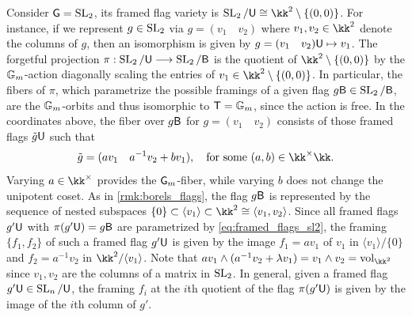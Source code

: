 \begin{example}\label{ex:framed_flags_SL2}
Consider $\mathsf{G}=\operatorname{SL}_2$, its framed flag variety is $\SL_2/\uni\cong\kk^2 \setminus \{(0,0)\}$. For instance, if we represent $g\in\operatorname{SL}_2$ via $g=(v_1\quad v_2)$ where $v_1,v_2\in\kk^2$ denote the columns of $g$, then an isomorphism is given by $g=(v_1\quad v_2)\mathsf{U}\mapsto v_1$. The forgetful projection $\pi:\operatorname{SL}_2/\mathsf{U}\longrightarrow\operatorname{SL}_2/\mathsf{B}$ is the quotient of $\kk^2 \setminus \{(0,0)\}$ by the $\mathbb{G}_m$-action diagonally scaling the entries of $v_1\in \kk^2 \setminus \{(0,0)\}$. In particular, the fibers of $\pi$, which parametrize the possible framings of a given flag $g\mathsf{B}\in\operatorname{SL}_2/\mathsf{B}$, are the $\mathbb{G}_m$-orbits and thus isomorphic to $\mathsf{T}=\mathbb{G}_m$, since the action is free. In the coordinates above, the fiber over $g\mathsf{B}$ for $g=(v_1\quad v_2)$ consists of those framed flags $\tilde{g}\mathsf{U}$ such that
\begin{equation}\label{eq:framed_flags_sl2}
\tilde{g}=(av_1\quad a^{-1}v_2+bv_1),\quad \mbox{for some }(a,b)\in\kk^\times\kk.
\end{equation}
Varying $a\in\kk^\times$ provides the $\mathsf{G}_m$-fiber, while varying $b$ does not change the unipotent coset. As in \cref{rmk:borels_flags},  the flag $g\mathsf{B}$ is represented by the sequence of nested subspaces $\{0\}\subset \langle v_1\rangle \subset \kk^2\cong\langle v_1,v_2\rangle$. Since all framed flags $g'\mathsf{U}$ with $\pi(g'\mathsf{U})=g\mathsf{B}$ are parametrized by \eqref{eq:framed_flags_sl2}, the framing $\{f_1,f_2\}$ of such a framed flag $g'\mathsf{U}$ is given by the image $f_1=av_1$ of $v_1$ in $\langle v_1\rangle/\{0\}$ and $f_2=a^{-1}v_2$ in $\kk^2/\langle v_1\rangle$. Note that $av_1\wedge(a^{-1}v_2+\lambda v_1)=v_1\wedge v_2=\on{vol}_{\kk^2}$ since $v_1,v_2$ are the columns of a matrix in $\operatorname{SL}_2$. In general, given a framed flag $g'\mathsf{U}\in\operatorname{SL}_n/\mathsf{U}$, the framing $f_i$ at the $i$th quotient of the flag $\pi(g'\mathsf{U})$ is given by the image of the $i$th column of $g'$.\sbs
\end{example}

